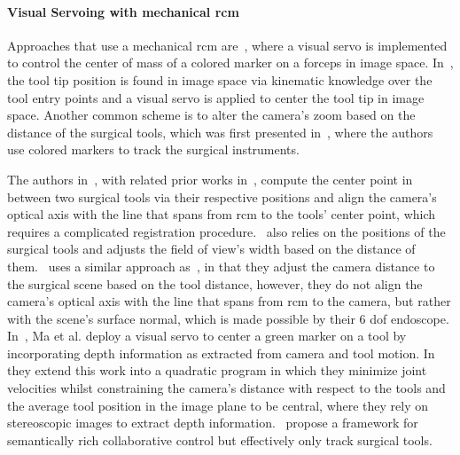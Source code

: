 \paragraph{Visual Servoing with mechanical \gls{rcm}}
Approaches that use a mechanical \gls{rcm} are~\cite{omote1999self}, where a visual servo is implemented to control the center of mass of a colored marker on a forceps in image space. In~\cite{agustinos2014visual, voros2007automatic}, the tool tip position is found in image space via kinematic knowledge over the tool entry points and a visual servo is applied to center the tool tip in image space. Another common scheme is to alter the camera's zoom based on the distance of the surgical tools, which was first presented in~\cite{king2013towards}, where the authors use colored markers to track the surgical instruments.

The authors in~\cite{eslamian2020development, mariani2020experimental, da2020scan}, with related prior works in~\cite{Eslamian2016TowardsTI, eslamian2017autonomous}, compute the center point in between two surgical tools via their respective positions and align the camera's optical axis with the line that spans from \gls{rcm} to the tools' center point, which requires a complicated registration procedure.~\cite{yu2016automatic} also relies on the positions of the surgical tools and adjusts the field of view's width based on the distance of them.~\cite{abdelaal2020orientation} uses a similar approach as~\cite{eslamian2020development}, in that they adjust the camera distance to the surgical scene based on the tool distance, however, they do not align the camera's optical axis with the line that spans from \gls{rcm} to the camera, but rather with the scene's surface normal, which is made possible by their 6 \gls{dof} endoscope. In~\cite{ma2019autonomous}, Ma et al. deploy a visual servo to center a green marker on a tool by incorporating depth information as extracted from camera and tool motion. In~\cite{ma2020visual} they extend this work into a quadratic program in which they minimize joint velocities whilst constraining the camera's distance with respect to the tools and the average tool position in the image plane to be central, where they rely on stereoscopic images to extract depth information.~\cite{gruijthuijsen2021autonomous} propose a framework for semantically rich collaborative control but effectively only track surgical tools.






